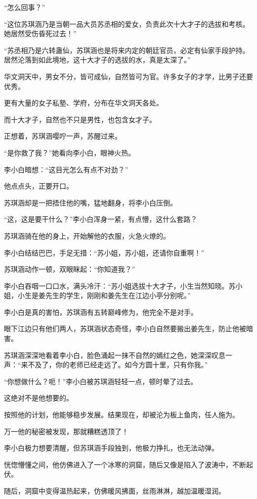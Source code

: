 \begin{this_body}
“怎么回事？”

“这位苏琪涵乃是当朝一品大员苏丞相的爱女，负责此次十大才子的选拔和考核。她居然受伤昏死过去！”

“苏丞相乃是六转蛊仙，苏琪涵也是将来内定的朝廷官员，必定有仙家手段护持。居然沦落到如此境地，这十大才子的选拔的水，真是太深了。”

华文洞天中，男女不分，皆可成仙，自然皆可为官。许多女子的才学，比男子还要优秀。

更有大量的女子私塾、学府，分布在华文洞天各处。

而十大才子，自然也不只是男性，也包含女才子。

正想着，苏琪涵嘤咛一声，苏醒过来。

“是你救了我？”她看向李小白，眼神火热。

李小白暗想：“这目光怎么有点不对劲？”

他点点头，正要开口。

苏琪涵却是一把捂住他的嘴，猛地翻身，将李小白压倒。

“这，这是要干什么？”李小白浑身一紧，有点懵，这什么套路？

苏琪涵骑在他的身上，开始解他的衣服，火急火燎的。

李小白结结巴巴，手足无措：“苏小姐，苏小姐，还请你自重啊！”

苏琪涵动作一顿，双眼眯起：“你知道我？”

李小白吞咽一口口水，满头冷汗：“苏小姐选拔十大才子，小生当然知晓。苏小姐，小生是姜先生的学生，刚刚和姜先生在江边小亭分别呢。”

李小白是真的害怕，苏琪涵有五转巅峰修为，他完全不是对手。

眼下江边只有他们两人，苏琪涵状态奇怪，李小白自然要搬出姜先生，防止他被暗害。

苏琪涵深深地看着李小白，脸色涌起一抹不自然的嫣红之色，她深深叹息一声：“来不及了，你的老师已经走远了。如今方圆十里，只有你我。”

“你想做什么？呃！”李小白被苏琪涵轻轻一点，顿时晕了过去。

这绝对不是他想要的。

按照他的计划，他能够稳步发展。结果现在，却被沦为板上鱼肉，任人施为。

万一他的秘密被发现，那就糟糕透顶了！

李小白极力想要清醒，但苏琪涵手段独到，他极力挣扎，也无法动弹。

恍惚懵懂之间，他仿佛进入了一个冰寒的洞窟，随后又像是陷入了波涛中，不断起伏。

随后，洞窟中变得温热起来，仿佛暖风拂面，丝雨淋淋，越加温暖湿润。


\end{this_body}
